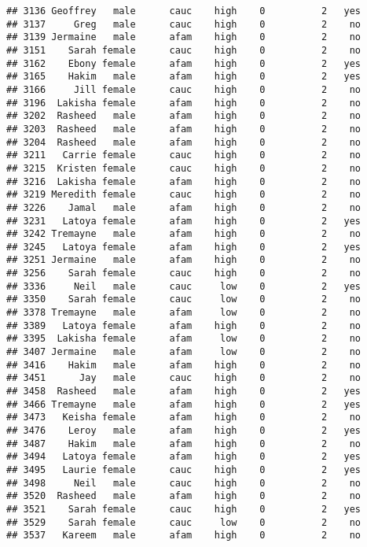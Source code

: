 \documentclass[
]{article}
\begin{document}
\begin{verbatim}
## 3136 Geoffrey   male      cauc    high    0          2   yes
## 3137     Greg   male      cauc    high    0          2    no
## 3139 Jermaine   male      afam    high    0          2    no
## 3151    Sarah female      cauc    high    0          2    no
## 3162    Ebony female      afam    high    0          2   yes
## 3165    Hakim   male      afam    high    0          2   yes
## 3166     Jill female      cauc    high    0          2    no
## 3196  Lakisha female      afam    high    0          2    no
## 3202  Rasheed   male      afam    high    0          2    no
## 3203  Rasheed   male      afam    high    0          2    no
## 3204  Rasheed   male      afam    high    0          2    no
## 3211   Carrie female      cauc    high    0          2    no
## 3215  Kristen female      cauc    high    0          2    no
## 3216  Lakisha female      afam    high    0          2    no
## 3219 Meredith female      cauc    high    0          2    no
## 3226    Jamal   male      afam    high    0          2    no
## 3231   Latoya female      afam    high    0          2   yes
## 3242 Tremayne   male      afam    high    0          2    no
## 3245   Latoya female      afam    high    0          2   yes
## 3251 Jermaine   male      afam    high    0          2    no
## 3256    Sarah female      cauc    high    0          2    no
## 3336     Neil   male      cauc     low    0          2   yes
## 3350    Sarah female      cauc     low    0          2    no
## 3378 Tremayne   male      afam     low    0          2    no
## 3389   Latoya female      afam    high    0          2    no
## 3395  Lakisha female      afam     low    0          2    no
## 3407 Jermaine   male      afam     low    0          2    no
## 3416    Hakim   male      afam    high    0          2    no
## 3451      Jay   male      cauc    high    0          2    no
## 3458  Rasheed   male      afam    high    0          2   yes
## 3466 Tremayne   male      afam    high    0          2   yes
## 3473   Keisha female      afam    high    0          2    no
## 3476    Leroy   male      afam    high    0          2   yes
## 3487    Hakim   male      afam    high    0          2    no
## 3494   Latoya female      afam    high    0          2   yes
## 3495   Laurie female      cauc    high    0          2   yes
## 3498     Neil   male      cauc    high    0          2    no
## 3520  Rasheed   male      afam    high    0          2    no
## 3521    Sarah female      cauc    high    0          2   yes
## 3529    Sarah female      cauc     low    0          2    no
## 3537   Kareem   male      afam    high    0          2    no

\end{verbatim}
\end{document}

